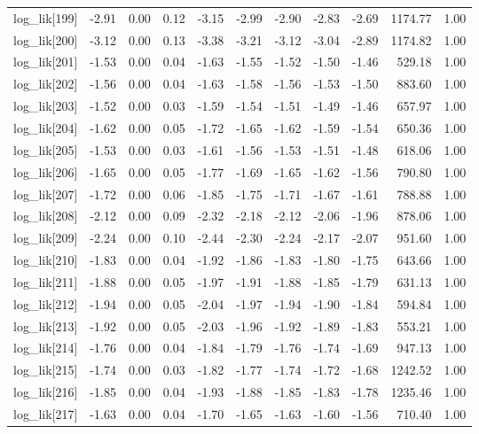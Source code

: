 \begin{table}[ht]
\begin{tabular}{rrrrrrrrrrr}
  log\_lik[199] & -2.91 & 0.00 & 0.12 & -3.15 & -2.99 & -2.90 & -2.83 & -2.69 & 1174.77 & 1.00 \\ 
  log\_lik[200] & -3.12 & 0.00 & 0.13 & -3.38 & -3.21 & -3.12 & -3.04 & -2.89 & 1174.82 & 1.00 \\ 
  log\_lik[201] & -1.53 & 0.00 & 0.04 & -1.63 & -1.55 & -1.52 & -1.50 & -1.46 & 529.18 & 1.00 \\ 
  log\_lik[202] & -1.56 & 0.00 & 0.04 & -1.63 & -1.58 & -1.56 & -1.53 & -1.50 & 883.60 & 1.00 \\ 
  log\_lik[203] & -1.52 & 0.00 & 0.03 & -1.59 & -1.54 & -1.51 & -1.49 & -1.46 & 657.97 & 1.00 \\ 
  log\_lik[204] & -1.62 & 0.00 & 0.05 & -1.72 & -1.65 & -1.62 & -1.59 & -1.54 & 650.36 & 1.00 \\ 
  log\_lik[205] & -1.53 & 0.00 & 0.03 & -1.61 & -1.56 & -1.53 & -1.51 & -1.48 & 618.06 & 1.00 \\ 
  log\_lik[206] & -1.65 & 0.00 & 0.05 & -1.77 & -1.69 & -1.65 & -1.62 & -1.56 & 790.80 & 1.00 \\ 
  log\_lik[207] & -1.72 & 0.00 & 0.06 & -1.85 & -1.75 & -1.71 & -1.67 & -1.61 & 788.88 & 1.00 \\ 
  log\_lik[208] & -2.12 & 0.00 & 0.09 & -2.32 & -2.18 & -2.12 & -2.06 & -1.96 & 878.06 & 1.00 \\ 
  log\_lik[209] & -2.24 & 0.00 & 0.10 & -2.44 & -2.30 & -2.24 & -2.17 & -2.07 & 951.60 & 1.00 \\ 
  log\_lik[210] & -1.83 & 0.00 & 0.04 & -1.92 & -1.86 & -1.83 & -1.80 & -1.75 & 643.66 & 1.00 \\ 
  log\_lik[211] & -1.88 & 0.00 & 0.05 & -1.97 & -1.91 & -1.88 & -1.85 & -1.79 & 631.13 & 1.00 \\ 
  log\_lik[212] & -1.94 & 0.00 & 0.05 & -2.04 & -1.97 & -1.94 & -1.90 & -1.84 & 594.84 & 1.00 \\ 
  log\_lik[213] & -1.92 & 0.00 & 0.05 & -2.03 & -1.96 & -1.92 & -1.89 & -1.83 & 553.21 & 1.00 \\ 
  log\_lik[214] & -1.76 & 0.00 & 0.04 & -1.84 & -1.79 & -1.76 & -1.74 & -1.69 & 947.13 & 1.00 \\ 
  log\_lik[215] & -1.74 & 0.00 & 0.03 & -1.82 & -1.77 & -1.74 & -1.72 & -1.68 & 1242.52 & 1.00 \\ 
  log\_lik[216] & -1.85 & 0.00 & 0.04 & -1.93 & -1.88 & -1.85 & -1.83 & -1.78 & 1235.46 & 1.00 \\ 
  log\_lik[217] & -1.63 & 0.00 & 0.04 & -1.70 & -1.65 & -1.63 & -1.60 & -1.56 & 710.40 & 1.00 \\ 

\end{tabular}
\end{table}
